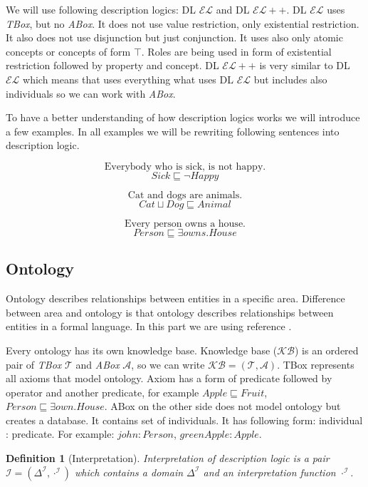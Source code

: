 \documentclass[12pt,a4paper]{article}
\newtheorem{definition}{Definition}[subsection]
\begin{document}
We will use following description logics: DL $\mathcal{EL}$ and DL $\mathcal{EL{+}{+}}$. DL $\mathcal{EL}$  uses \textit{TBox}, but no \textit{ABox}. It does not use value restriction, only existential restriction. It also does not use disjunction but just conjunction. It uses also only atomic concepts or concepts of form $\top$. Roles are being used in form of existential restriction followed by property and concept. DL $\mathcal{EL{+}{+}}$ is very similar to DL $\mathcal{EL}$ which means that uses everything what uses DL $\mathcal{EL}$ but includes also individuals so we can work with \textit{ABox}.

To have a better understanding of how description logics works we will introduce a few examples. In all examples we will be rewriting following sentences into description logic.

\[ \text{Everybody who is sick, is not happy.} \]
\[ Sick \sqsubseteq \neg Happy \]

\[ \text{Cat and dogs are animals.} \]
\[ Cat \sqcup Dog \sqsubseteq Animal \]

\[ \text{Every person owns a house.} \]
\[ Person \sqsubseteq \exists owns.House \]

\subsection{Ontology}
Ontology describes relationships between entities in a specific area. Difference between area and ontology is that ontology describes relationships between entities in a formal language. In this part we are using reference \citep{staabHandbookOntology}.

Every ontology has its own knowledge base. Knowledge base ($\mathcal{KB}$) is an ordered pair of \textit{TBox} $\mathcal{T}$ and \textit{ABox} $\mathcal{A}$, so we can write $\mathcal{KB} = (\mathcal{T}, \mathcal{A})$. TBox represents all axioms that model ontology. Axiom has a form of predicate followed by operator and another predicate, for example $Apple \sqsubseteq Fruit$, $Person \sqsubseteq \exists own.House$. ABox on the other side does not model ontology but creates a database. It contains set of individuals. It has following form: individual : predicate. For example: $john : Person$, $greenApple : Apple$.

\begin{definition}[Interpretation]
	Interpretation of description logic is a pair $\mathcal{I} = (\Delta^{\mathcal{I}}, \cdot ^{\mathcal{I}})$ which contains a domain $\Delta^{\mathcal{I}}$ and an interpretation function $\cdot ^{\mathcal{I}}$.	
\end{definition}
\end{document}
